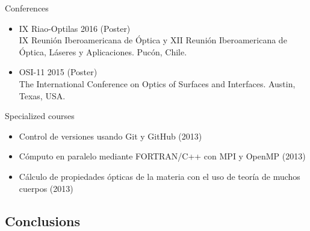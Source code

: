 \documentclass{beamer}
\begin{document}
\begin{frame}
\begin{columns}
\end{columns}

\end{frame}




\begin{frame}

{\Large Conferences}

\begin{itemize}

\item IX Riao-Optilas 2016 (Poster)\\
{\footnotesize IX Reuni\'on Iberoamericana de \'Optica y XII Reuni\'on
Iberoamericana de \'Optica, L\'aseres y Aplicaciones. Puc\'on, Chile.}

\item OSI-11 2015 (Poster) \\
{\footnotesize The International Conference on Optics of Surfaces and
Interfaces. Austin, Texas, USA.}

\end{itemize}

\vspace{7mm}

{\Large Specialized courses}

\begin{itemize}

\item Control de versiones usando Git y GitHub (2013)
\item C\'omputo en paralelo mediante FORTRAN/C++ con MPI y OpenMP (2013)
\item C\'alculo de propiedades \'opticas de la materia con el uso de teor\'ia
de muchos cuerpos (2013)

\end{itemize}


\end{frame}




\subsection{Conclusions}


\end{document}

